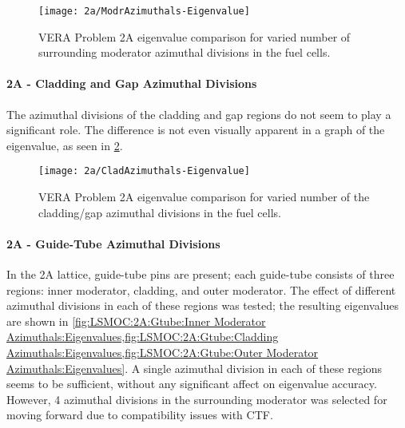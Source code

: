 {{{{{          \begin{figure}
            \centering
            \texttt{[image: 2a/ModrAzimuthals-Eigenvalue]}
            \caption{VERA Problem 2A eigenvalue comparison for varied number of surrounding moderator azimuthal divisions in the fuel cells. \label{fig:LSMOC:2A:Moderator Azimuthal:Eigenvalues}}
          \end{figure}
        }
        \paragraph{2A - Cladding and Gap Azimuthal Divisions}{
          The azimuthal divisions of the cladding and gap regions do not seem to play a significant role.
          The difference is not even visually apparent in a graph of the eigenvalue, as seen in \cref{fig:LSMOC:2A:Clad Azimuthal:Eigenvalues}.

          \begin{figure}
            \centering
            \texttt{[image: 2a/CladAzimuthals-Eigenvalue]}
            \caption{VERA Problem 2A eigenvalue comparison for varied number of the cladding/gap azimuthal divisions in the fuel cells. \label{fig:LSMOC:2A:Clad Azimuthal:Eigenvalues}}
          \end{figure}
        }
        \paragraph{2A - Guide-Tube Azimuthal Divisions}{
          In the 2A lattice, guide-tube pins are present; each guide-tube consists of three regions: inner moderator, cladding, and outer moderator.
          The effect of different azimuthal divisions in each of these regions was tested; the resulting eigenvalues are shown in \cref{fig:LSMOC:2A:Gtube:Inner Moderator Azimuthals:Eigenvalues,fig:LSMOC:2A:Gtube:Cladding Azimuthals:Eigenvalues,fig:LSMOC:2A:Gtube:Outer Moderator Azimuthals:Eigenvalues}.
          A single azimuthal division in each of these regions seems to be sufficient, without any significant affect on eigenvalue accuracy.
          However, 4 azimuthal divisions in the surrounding moderator was selected for moving forward due to compatibility issues with \ac{CTF}.

}}}}}
